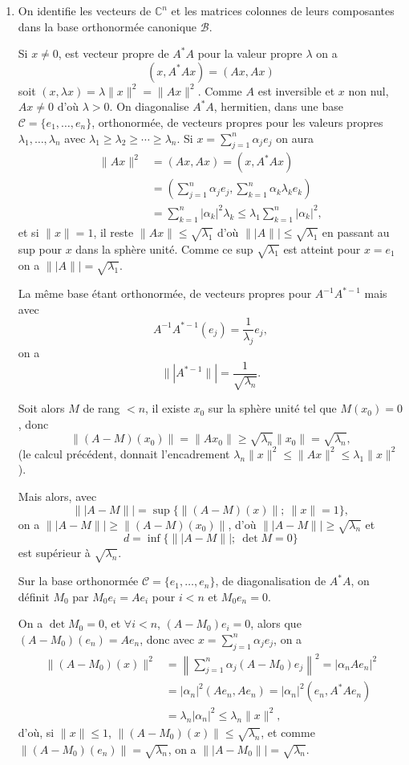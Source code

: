 \begin{enumerate}[label=\arabic*.,leftmargin=2.2em,itemsep=1.15em]
\item On identifie les vecteurs de $\mathbb C^n$ et les matrices colonnes de leurs composantes dans la base orthonormée canonique $\mathcal B$.

Si $x\ne0$, est vecteur propre de $A^*A$ pour la valeur propre $\lambda$ on a
\[
(x,A^*Ax)=(Ax,Ax)
\]
soit $(x,\lambda x)=\lambda\|x\|^2=\|Ax\|^2$. Comme $A$ est inversible et $x$ non nul, $Ax\ne0$ d'où $\lambda>0$. On diagonalise $A^*A$, hermitien, dans une base $\mathcal C=\{e_1,\ldots,e_n\}$, orthonormée, de vecteurs propres pour les valeurs propres $\lambda_1,\ldots,\lambda_n$ avec $\lambda_1\ge\lambda_2\ge\cdots\ge\lambda_n$. Si $x=\sum_{j=1}^n\alpha_je_j$ on aura
\[
\begin{aligned}
\|Ax\|^2&=(Ax,Ax)=(x,A^*Ax)\\
&=\left(\sum_{j=1}^n\alpha_je_j,\sum_{k=1}^n\alpha_k\lambda_ke_k\right)\\
&=\sum_{k=1}^n|\alpha_k|^2\lambda_k
\le\lambda_1\sum_{k=1}^n|\alpha_k|^2,
\end{aligned}
\]
et si $\|x\|=1$, il reste $\|Ax\|\le\sqrt{\lambda_1}$ d'où $\|\!|A\|\!|\le\sqrt{\lambda_1}$ en passant au sup pour $x$ dans la sphère unité. Comme ce sup $\sqrt{\lambda_1}$ est atteint pour $x=e_1$ on a $\|\!|A\|\!|=\sqrt{\lambda_1}$.

La même base étant orthonormée, de vecteurs propres pour $A^{-1}A^{*-1}$ mais avec
\[
A^{-1}A^{*-1}(e_j)=\frac1{\lambda_j}e_j,
\]
on a
\[
\|\!|A^{*-1}\|\!|=\frac1{\sqrt{\lambda_n}}.
\]

Soit alors $M$ de rang $<n$, il existe $x_0$ sur la sphère unité tel que $M(x_0)=0$, donc
\[
\|(A-M)(x_0)\|=\|Ax_0\|\ge\sqrt{\lambda_n}\|x_0\|=\sqrt{\lambda_n},
\]
(le calcul précédent, donnait l'encadrement $\lambda_n\|x\|^2\le\|Ax\|^2\le\lambda_1\|x\|^2$).

Mais alors, avec
\[
\|\!|A-M\|\!|=\sup\{\|(A-M)(x)\|;\ \|x\|=1\},
\]
on a $\|\!|A-M\|\!|\ge\|(A-M)(x_0)\|$, d'où $\|\!|A-M\|\!|\ge\sqrt{\lambda_n}$ et
\[
d=\inf\{\|\!|A-M\|\!|;\ \det M=0\}
\]
est supérieur à $\sqrt{\lambda_n}$.

Sur la base orthonormée $\mathcal C=\{e_1,\ldots,e_n\}$, de diagonalisation de $A^*A$, on définit $M_0$ par $M_0e_i=Ae_i$ pour $i<n$ et $M_0e_n=0$.

On a $\det M_0=0$, et $\forall i<n$, $(A-M_0)e_i=0$, alors que $(A-M_0)(e_n)=Ae_n$, donc avec $x=\sum_{j=1}^n\alpha_je_j$, on a
\[
\begin{aligned}
\|(A-M_0)(x)\|^2
&=\left\|\sum_{j=1}^n\alpha_j(A-M_0)e_j\right\|^2
=|\alpha_nAe_n|^2\\
&=|\alpha_n|^2(Ae_n,Ae_n)
=|\alpha_n|^2(e_n,A^*Ae_n)\\
&=\lambda_n|\alpha_n|^2\le\lambda_n\|x\|^2,
\end{aligned}
\]
d'où, si $\|x\|\le1$, $\|(A-M_0)(x)\|\le\sqrt{\lambda_n}$, et comme $\|(A-M_0)(e_n)\|=\sqrt{\lambda_n}$, on a $\|\!|A-M_0\|\!|=\sqrt{\lambda_n}$.


\end{enumerate}
